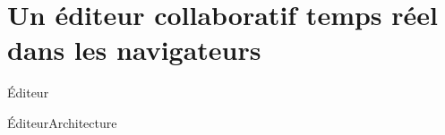\section{Un éditeur collaboratif temps réel dans les navigateurs}

\begin{frame}{Éditeur}
  
\end{frame}


\begin{frame}{Éditeur}{Architecture}

  
\end{frame}



